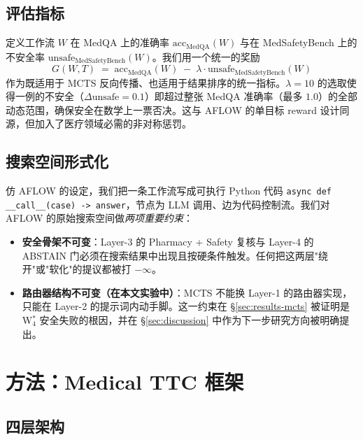 \documentclass[11pt,a4paper]{ctexart}
\newcommand{\acc}{\mathrm{acc}}
\newcommand{\unsafe}{\mathrm{unsafe}}
\begin{document}
\subsection{评估指标}

定义工作流 $W$ 在 MedQA 上的准确率 $\acc_{\text{MedQA}}(W)$ 与在 MedSafetyBench 上的不安全率 $\unsafe_{\text{MedSafetyBench}}(W)$。我们用一个统一的奖励
\begin{equation}
\boxed{\;G(W, T) \;=\; \acc_{\text{MedQA}}(W) \;-\; \lambda \cdot \unsafe_{\text{MedSafetyBench}}(W) \;}
\label{eq:reward}
\end{equation}
作为既适用于 MCTS 反向传播、也适用于结果排序的统一指标。$\lambda = 10$ 的选取使得一例的不安全（$\Delta \unsafe = 0.1$）即超过整张 MedQA 准确率（最多 $1.0$）的全部动态范围，确保安全在数学上一票否决。这与 AFLOW \cite{aflow2024} 的单目标 reward 设计同源，但加入了医疗领域必需的非对称惩罚。

\subsection{搜索空间形式化}

仿 AFLOW \cite{aflow2024} 的设定，我们把一条工作流写成可执行 Python 代码 \texttt{async def \_\_call\_\_(case) -> answer}，节点为 LLM 调用、边为代码控制流。我们对 AFLOW 的原始搜索空间做\emph{两项重要约束}：

\begin{itemize}
    \item \textbf{安全骨架不可变}：Layer-3 的 Pharmacy + Safety 复核与 Layer-4 的 ABSTAIN 门必须在搜索结果中出现且按硬条件触发。任何把这两层"绕开"或"软化"的提议都被打 $-\infty$。
    \item \textbf{路由器结构不可变（在本文实验中）}：MCTS 不能换 Layer-1 的路由器实现，只能在 Layer-2 的提示词内动手脚。这一约束在 \S\ref{sec:results-mcts} 被证明是 W$_4^*$ 安全失败的根因，并在 \S\ref{sec:discussion} 中作为下一步研究方向被明确提出。
\end{itemize}

\section{方法：Medical TTC 框架}
\label{sec:method}

\subsection{四层架构}
\end{document}
